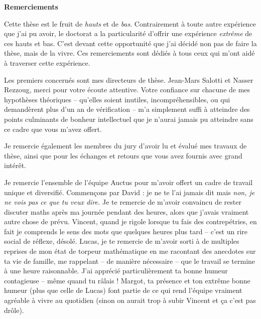 \setcounter{page}{1}
\pagestyle{plain}
\begin{center}
    \textbf{Remerciements}
\end{center}
Cette thèse est le fruit de \emph{hauts} et de \emph{bas}. Contrairement à toute autre expérience que j'ai pu avoir, le doctorat a la particularité d'offrir une expérience \emph{extrême} de ces hauts et bas.
C'est devant cette opportunité que j'ai décidé non pas de faire la thèse, mais de la vivre. Ces remerciements sont dédiés
à tous ceux qui m'ont aidé à traverser cette expérience.

Les premiers concernés sont mes directeurs de thèse. Jean-Mars Salotti et Nasser Rezzoug, merci
pour votre écoute attentive. Votre confiance sur chacune de mes hypothèses théoriques -- qu'elles soient inutiles, incompréhensibles, ou qui demandèrent plus d'un an de vérification -- m'a 
simplement suffi à atteindre des points culminants de bonheur intellectuel que je n'aurai jamais pu atteindre sans ce cadre que vous m'avez offert.

Je remercie également les membres du jury d'avoir lu et évalué mes travaux de thèse, ainsi que pour les échanges et retours que vous avez fournis avec grand intérêt.

Je remercie l'ensemble de l'équipe Auctus pour m'avoir offert un cadre de travail unique et diversifié. Commençons par David : je ne te l'ai jamais dit mais \emph{non, je ne vois pas ce que tu veux dire.}
Je te remercie de m'avoir convaincu de rester discuter maths après ma journée pendant des heures, alors que j'avais vraiment autre chose de prévu. 
Vincent, quand je rigole lorsque tu fais des contrepétries, en fait je comprends le sens des mots que quelques heures plus tard -- c'est un rire social de réflexe, désolé.
Lucas, je te remercie de m'avoir sorti à de multiples reprises de mon état de torpeur mathématique en me racontant des anecdotes sur ta vie de famille, me rappelant -- de manière nécessaire -- que 
le travail se termine à une heure raisonnable. J'ai apprécié particulièrement ta bonne humeur contagieuse -- même quand tu râlais !
Margot, ta présence et ton extrême bonne humeur (plus que celle de Lucas) font partie de ce qui rend l'équipe vraiment agréable 
à vivre au quotidien (sinon on aurait trop à subir Vincent et ça c'est pas drôle).

